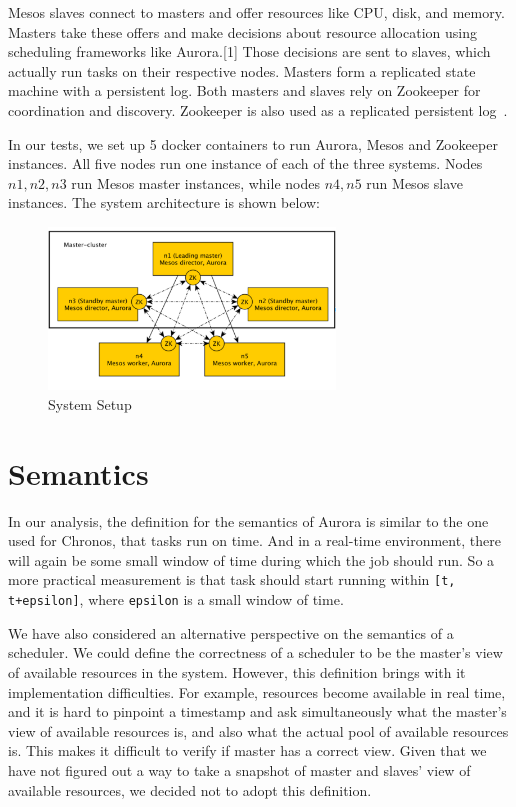 \documentclass[letterpaper,twocolumn,10pt]{article}
\begin{document}
Mesos slaves connect to masters and offer resources like CPU, disk, and memory. Masters take these offers and make decisions about resource allocation using scheduling frameworks like Aurora.[1] Those decisions are sent to slaves, which actually run tasks on their respective nodes. Masters form a replicated state machine with a persistent log. Both masters and slaves rely on Zookeeper for coordination and discovery. Zookeeper is also used as a replicated persistent log~\cite{Aurora}. 

In our tests, we set up 5 docker containers to run Aurora, Mesos and Zookeeper instances. All five nodes run one instance of each of the three systems. Nodes $n1, n2,n3$ run Mesos master instances, while nodes $n4, n5$ run Mesos slave instances. The system architecture is shown below:\\
\begin{figure}
\centering
\includegraphics[width=3in]{systemSetup}
\caption{System Setup}
\label{fig:my_label}
\end{figure}

\section{Semantics}
In our analysis, the definition for the semantics of Aurora is similar to the one used for Chronos, that tasks run on time. And in a real-time environment, there will again be some small window of time during which the job should run. So a more practical measurement is that task should start running within \verb|[t, t+epsilon]|, where \verb|epsilon| is a small window of time.  

We have also considered an alternative perspective on the semantics of a scheduler. We could define the correctness of a scheduler to be the master’s view of available resources in the system. However, this definition brings with it implementation difficulties. For example, resources become available in real time, and it is hard to pinpoint a timestamp and ask simultaneously what the master's view of available resources is, and also what the actual pool of available resources is. This makes it difficult to verify if master has a correct view. Given that we have not figured out a way to take a snapshot of master and slaves’ view of available resources, we decided not to adopt this definition.
\end{document}
